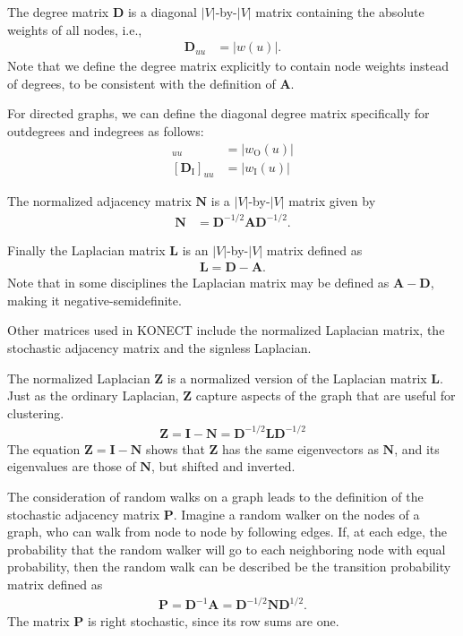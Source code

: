 \documentclass{article}
\begin{document}
The degree matrix $\mathbf D$ is a diagonal $|V|$-by-$|V|$ matrix containing
the absolute weights of all nodes, i.e.,
\begin{align}
  \mathbf D_{uu} &= |w(u)|. 
\end{align}
Note that we define the degree matrix explicitly to contain node weights
instead of degrees, to be consistent with the definition of $\mathbf
A$. 

For directed graphs, we can define the diagonal degree matrix
specifically for outdegrees and indegrees as follows:
\begin{align}
  [\mathbf D_{\mathrm O}]_{uu} &= |w_{\mathrm O}(u)| \\
  [\mathbf D_{\mathrm I}]_{uu} &= |w_{\mathrm I}(u)| 
\end{align}

The normalized adjacency matrix $\mathbf N$ is a $|V|$-by-$|V|$ matrix
given by
\begin{align}
  \mathbf N &= \mathbf D^{-1/2} \mathbf A \mathbf D^{-1/2}. 
\end{align}

Finally the Laplacian matrix $\mathbf L$ is an $|V|$-by-$|V|$ matrix
defined as
\begin{align}
  \mathbf L = \mathbf D - \mathbf A. 
\end{align}
Note that in some disciplines the Laplacian matrix may be defined as
$\mathbf A - \mathbf D$, making it negative-semidefinite. 


Other matrices used in KONECT include the
normalized Laplacian matrix, the stochastic adjacency matrix and the
signless Laplacian. 

The normalized Laplacian $\mathbf Z$ is a normalized version of the Laplacian matrix
$\mathbf L$.  Just as the ordinary Laplacian, $\mathbf Z$ capture
aspects of the graph that are useful for clustering. 
\begin{align}
  \mathbf Z = \mathbf I - \mathbf N = \mathbf D^{-1/2} \mathbf L \mathbf
  D^{-1/2}
\end{align}
The equation $\mathbf Z = \mathbf I - \mathbf N$ shows that $\mathbf Z$
has the same eigenvectors as $\mathbf N$, and its eigenvalues are those
of $\mathbf N$, but shifted and inverted. 

The consideration of random walks on a graph leads to the definition of
the stochastic adjacency matrix $\mathbf P$.  Imagine a random walker on
the nodes of a graph, who can walk from node to node by following
edges.  If, at each edge, the probability that the random walker will go
to each neighboring node with equal probability, then the random walk
can be described be the transition probability matrix defined as
\begin{align}
  \mathbf P = \mathbf D^{-1} \mathbf A = \mathbf D^{-1/2} \mathbf N
  \mathbf D^{1/2}.
\end{align}
The matrix $\mathbf P$ is right stochastic, since its row sums are one. 
\end{document}
